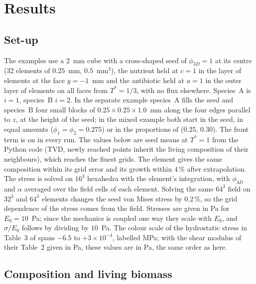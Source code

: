 \documentclass[11pt,a4paper]{article}
\newcommand{\phiD}{\phi_{3D}}
\begin{document}
\section{Results}
\label{sec:results}

\subsection{Set-up}
\label{sec:setup}

The examples use a 2~mm cube with a cross-shaped seed of $\phiD=1$ at its centre (32 elements of $0.25$~mm, $0.5$~mm$^3$), the nutrient held at $c=1$ in the layer of elements at the face $y=-1$~mm and the antibiotic held at $a=1$ in the outer layer of elements on all faces from $T^*=1/3$, with no flux elsewhere. Species~A is $i=1$, species~B $i=2$. In the separate example species~A fills the seed and species~B four small blocks of $0.25\times0.25\times1.0$~mm along the four edges parallel to $z$, at the height of the seed; in the mixed example both start in the seed, in equal amounts ($\phi_1=\phi_2=0.275$) or in the proportions of \citet{Fritsch2025BayesianMicrofilms} ($0.25$, $0.30$). The front term is on in every run. The values below are seed means at $T^*=1$ from the Python code (TVD, newly reached points inherit the living composition of their neighbours), which reaches the finest grids. The element gives the same composition within its grid error and its growth within $4\,\%$ after extrapolation. The stress is solved on $16^3$ hexahedra with the element's integration, with $\phiD$ and $\alpha$ averaged over the field cells of each element. Solving the same $64^3$ field on $32^3$ and $64^3$ elements changes the seed von Mises stress by $0.2\,\%$, so the grid dependence of the stress comes from the field. Stresses are given in Pa for $E_0=10$~Pa; since the mechanics is coupled one way they scale with $E_0$, and $\sigma/E_0$ follows by dividing by $10$~Pa. The colour scale of the hydrostatic stress in Table~3 of \citet{Klempt2024DiffusionDrivenGrowth} spans $-6.5$ to $+3\times10^{-4}$, labelled MPa; with the shear modulus of their Table~2 given in Pa, these values are in Pa, the same order as here.

\subsection{Composition and living biomass}
\label{sec:composition}
\end{document}
